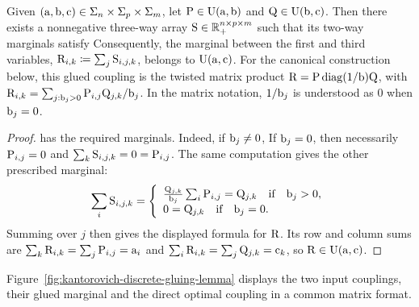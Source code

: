 \begin{lem}\label{lem-gluing-discr}
	Given $(\a,\b,\VectMode{c}) \in \simplex_n \times \simplex_p \times \simplex_m$,
	let $\P \in \CouplingsD(\a,\b)$ and $\Q \in \CouplingsD(\b,\VectMode{c})$. Then there exists a nonnegative three-way array $\S \in \RR_+^{n \times p \times m}$
	such that its two-way marginals satisfy
	Consequently, the marginal between the first and third variables,
	$\R_{i,k}\eqdef\sum_j\S_{i,j,k}$, belongs to
	$\CouplingsD(\a,\VectMode{c})$. For the canonical construction below, this
	glued coupling is the twisted matrix product
	$\R=\P\diag(1/\b)\Q$, with
	$\R_{i,k}=\sum_{j:\b_j>0}\P_{i,j}\Q_{j,k}/\b_j$.
	In the matrix notation, $1/\b_j$ is understood as $0$ when $\b_j=0$.
\end{lem}
\begin{proof}
		has the required marginals. Indeed, if $\b_j \neq 0$,
	If $\b_j = 0$, then necessarily $\P_{i,j}=0$ and $\sum_{k} \S_{i,j,k} = 0 = \P_{i,j}$.
	The same computation gives the other prescribed marginal:
	\[
		\sum_i \S_{i,j,k}
		=
		\choice{
			\frac{\Q_{j,k}}{\b_j}\sum_i\P_{i,j}=\Q_{j,k} \qifq \b_j>0,\\
			0=\Q_{j,k} \qifq \b_j=0.
		}
	\]
	Summing over $j$ then gives the displayed formula for $\R$. Its row and
	column sums are $\sum_k\R_{i,k}=\sum_j\P_{i,j}=\a_i$ and
	$\sum_i\R_{i,k}=\sum_j\Q_{j,k}=\VectMode{c}_k$, so
	$\R\in\CouplingsD(\a,\VectMode{c})$.
\end{proof}

Figure~\ref{fig:kantorovich-discrete-gluing-lemma} displays the two input couplings, their glued marginal and the direct optimal coupling in a common matrix format.

